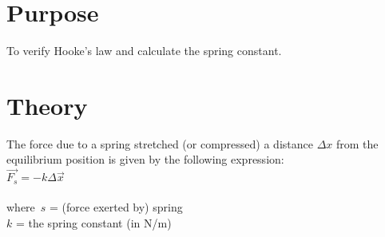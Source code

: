 \begingroup
\let\clearpage\relax\chapter{Purpose}

\indent To verify Hooke's law and calculate the spring constant.

\chapter{Theory}
\endgroup

The force due to a spring stretched (or compressed) a distance $\Delta x$ from the 
equilibrium position is given by the following expression:\\

$\vec{F_s} = -k\Delta \vec{x}$\\\\
\noindent where $\,s$ = (force exerted by) spring\\
\indent\indent $k$ = the spring constant (in N/m)